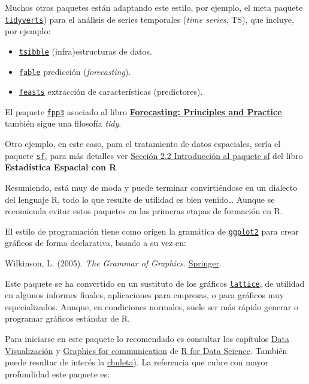 \documentclass[
]{book}
\providecommand{\tightlist}{%
  \setlength{\itemsep}{0pt}\setlength{\parskip}{0pt}}
\begin{document}
Muchos otros paquetes están adaptando este estilo, por ejemplo, el meta paquete \href{https://tidyverts.org/}{\texttt{tidyverts}}) para el análisis de series temporales (\emph{time series}, TS), que incluye, por ejemplo:

\begin{itemize}
\tightlist
\item
  \href{https://tsibble.tidyverts.org/}{\texttt{tsibble}} (infra)estructuras de datos.
\item
  \href{https://fable.tidyverts.org/}{\texttt{fable}} predicción (\emph{forecasting}).
\item
  \href{https://feasts.tidyverts.org/}{\texttt{feasts}} extracción de características (predictores).
\end{itemize}

El paquete \href{https://github.com/robjhyndman/fpp3package}{\texttt{fpp3}} asociado al libro \href{https://otexts.com/fpp3/}{\textbf{Forecasting: Principles and Practice}} también sigue una filosofía \emph{tidy}.

Otro ejemplo, en este caso, para el tratamiento de datos espaciales, sería el paquete \href{https://github.com/r-spatial/sf/}{\texttt{sf}}, para más detalles ver \href{https://rubenfcasal.github.io/estadistica_espacial/sf-intro.html}{Sección 2.2 Introducción al paquete sf} del libro \textbf{Estadística Espacial con R}

Resumiendo, está muy de moda y puede terminar convirtiéndose en un dialecto del lenguaje R, todo lo que resulte de utilidad es bien venido\ldots{} Aunque se recomienda evitar estos paquetes en las primeras etapas de formación en R.

El estilo de programación tiene como origen la gramática de \href{https://ggplot2.tidyverse.org}{\texttt{ggplot2}} para crear gráficos de forma declarativa, basado a su vez en:

Wilkinson, L. (2005). \emph{The Grammar of Graphics}. \href{https://www.google.es/books/edition/The_Grammar_of_Graphics/YGgUswEACAAJ?hl=es}{Springer}.

Este paquete se ha convertido en un sustituto de los gráficos \href{http://lattice.r-forge.r-project.org/}{\texttt{lattice}}, de utilidad en algunos informes finales, aplicaciones para empresas, o para gráficos muy especializados. Aunque, en condiciones normales, suele ser más rápido generar o programar gráficos estándar de R.

Para iniciarse en este paquete lo recomendado es consultar los capítulos \href{https://r4ds.had.co.nz/data-visualisation.html}{Data Visualización} y \href{https://r4ds.had.co.nz/graphics-for-communication.html}{Graphics for communication} de \href{https://r4ds.had.co.nz}{R for Data Science}.
También puede resultar de interés la \href{https://github.com/rstudio/cheatsheets/blob/master/data-visualization.pdf}{chuleta}).
La referencia que cubre con mayor profundidad este paquete es:
\end{document}
